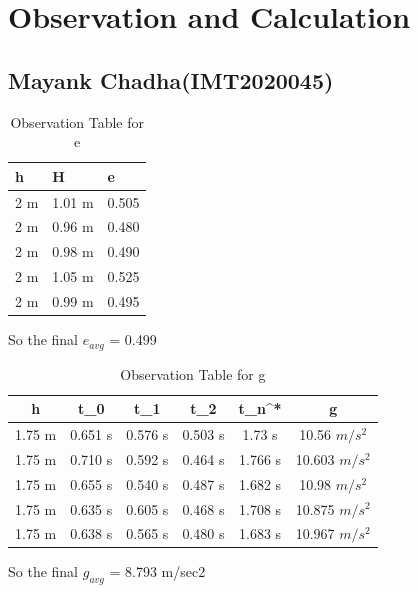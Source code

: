 \documentclass[11pt]{scrartcl} %
\begin{document}
\newpage
\section{Observation and Calculation}
\subsection{Mayank Chadha(IMT2020045)}

\begin{table}[h] %
	\centering %
	\begin{tabular}{l l l}
		\toprule
		\textbf{h} & \textbf{H} & \textbf{e} \\
		\midrule
		2 m & 1.01 m & 0.505\\
        2 m & 0.96 m  & 0.480\\
        2 m & 0.98 m  & 0.490\\
        2 m & 1.05 m & 0.525 \\
        2 m & 0.99 m & 0.495 \\
		\bottomrule
	\end{tabular}
	\caption{Observation Table for e}
\end{table}
So the final $e_{avg}$ = 0.499

\begin{table}[h]
\centering
\begin{tabular}{||c c c c c c||} 
\toprule
 \hline
 h & t_0 & t_1 & t_2 & t_n^* & g \\ [0.5ex] 
 \midrule
 \hline\hline
 1.75 m & 0.651 s & 0.576 s  & 0.503 s & 1.73 s & 10.56 $m/s^2$  \\ 
 \hline
 1.75 m & 0.710 s & 0.592 s & 0.464 s & 1.766 s & 10.603 $m/s^2$  \\
 \hline
 1.75 m & 0.655 s & 0.540 s & 0.487 s & 1.682 s  & 10.98 $m/s^2$   \\
 \hline
 1.75 m & 0.635 s & 0.605 s & 0.468 s & 1.708 s  & 10.875 $m/s^2$   \\
 \hline
 1.75 m & 0.638 s & 0.565 s & 0.480 s & 1.683 s  & 10.967 $m/s^2$  \\ [1ex]
 \bottomrule
 \hline
\end{tabular}
\caption{Observation Table for g}
\end{table}
So the final $g_{avg}$ = 8.793 m/sec2
\newpage
\end{document}
